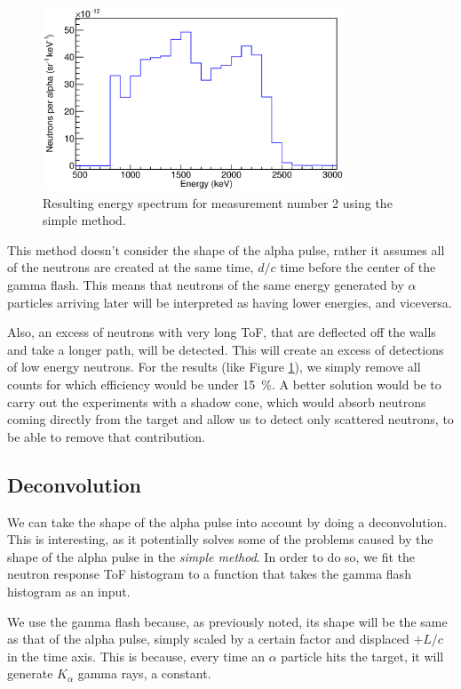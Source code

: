 \documentclass[a4paper,12pt]{report}
\begin{document}
\begin{figure}[H]
	\centering
	\includegraphics[width=0.80\textwidth]{pulsed_energysimple.eps}
	\caption{Resulting energy spectrum for measurement number 2 using the simple method.}
	\label{pulsed_energysimple}
\end{figure}

This method doesn't consider the shape of the alpha pulse, rather it assumes all of the neutrons are created at the same time, $d/c$ time before the center of the gamma flash.
This means that neutrons of the same energy generated by $\alpha$ particles arriving later will be interpreted as having lower energies, and viceversa.

Also, an excess of neutrons with very long ToF, that are deflected off the walls and take a longer path, will be detected.
This will create an excess of detections of low energy neutrons.
For the results (like Figure \ref{pulsed_energysimple}), we simply remove all counts for which efficiency would be under \qty{15}{\percent}.
A better solution would be to carry out the experiments with a shadow cone, which would absorb neutrons coming directly from the target and allow us to detect only scattered neutrons, to be able to remove that contribution.

\subsection{Deconvolution}
We can take the shape of the alpha pulse into account by doing a deconvolution.
This is interesting, as it potentially solves some of the problems caused by the shape of the alpha pulse in the \textit{simple method}.
In order to do so, we fit the neutron response ToF histogram to a function that takes the gamma flash histogram as an input.

We use the gamma flash because, as previously noted, its shape will be the same as that of the alpha pulse, simply scaled by a certain factor and displaced $+L/c$ in the time axis.
This is because, every time an $\alpha$ particle hits the target, it will generate $K_\alpha$ gamma rays, a constant.
\\
\end{document}
